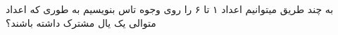به چند طریق میتوانیم اعداد ۱ تا ۶ را روی وجوه تاس بنویسیم به طوری که اعداد متوالی یک یال مشترک داشته باشند؟